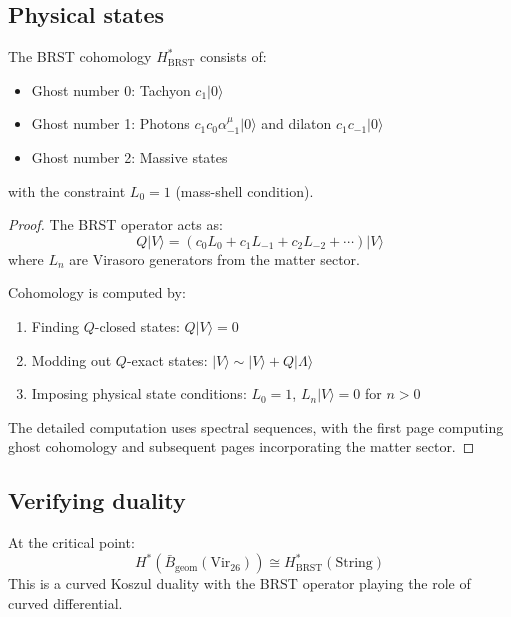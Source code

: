 \subsection{Physical states}
 
\begin{theorem}
\label{thm:brst-cohomology}
The BRST cohomology $H^*_{\text{BRST}}$ consists of:
\begin{itemize}
\item Ghost number 0: Tachyon $c_1|0\rangle$
\item Ghost number 1: Photons $c_1c_0\alpha^\mu_{-1}|0\rangle$ and dilaton $c_1c_{-1}|0\rangle$
\item Ghost number 2: Massive states
\end{itemize}
with the constraint $L_0 = 1$ (mass-shell condition).
\end{theorem}
 
\begin{proof}
The BRST operator acts as:
\[
Q|V\rangle = \left(c_0L_0 + c_1L_{-1} + c_2L_{-2} + \cdots\right)|V\rangle
\]
where $L_n$ are Virasoro generators from the matter sector.
 
Cohomology is computed by:
\begin{enumerate}
\item Finding $Q$-closed states: $Q|V\rangle = 0$
\item Modding out $Q$-exact states: $|V\rangle \sim |V\rangle + Q|\Lambda\rangle$
\item Imposing physical state conditions: $L_0 = 1$, $L_n|V\rangle = 0$ for $n > 0$
\end{enumerate}
 
The detailed computation uses spectral sequences, with the first page computing ghost cohomology and 
subsequent pages incorporating the matter sector.
\end{proof}
 
\subsection{Verifying duality}
 
\begin{theorem}\label{thm:virasoro-string}
At the critical point:
\[
H^*(\bar{B}_{\mathrm{geom}}(\mathrm{Vir}_{26})) \cong H^*_{\mathrm{BRST}}(\mathrm{String})
\]
This is a curved Koszul duality with the BRST operator playing the role of curved differential.
\end{theorem}

